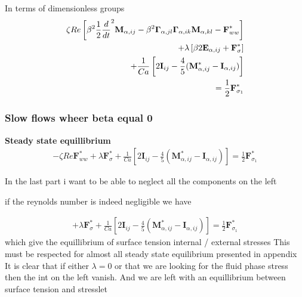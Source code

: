 In terms of dimensionless groups
\begin{align*}
    \zeta Re\left[
        \beta^2 \frac{1}{2}\frac{d}{d t}^2 \textbf{M}_{\alpha,ij}
    -   \beta^2 \bm\Gamma_{\alpha,jl}\bm\Gamma_{\alpha,ik} \textbf{M}_{\alpha,kl}  
    - \textbf{F}_{ww}^*
    \right]\\
    + \lambda  \left[
        \beta 2\textbf{E}_{\alpha,ij}
    +  \textbf{F}_\sigma^*
    \right]\\
    + \frac{1}{Ca} \left[
    2\textbf{I}_{ij} 
    - \frac{4  }{5} (\textbf{M}_{\alpha,ij}^* - \textbf{I}_{\alpha,ij})
    \right]\\
    = 
    \frac{1}{2}
    \textbf{F}_{\sigma_1}^*
\end{align*}


\subsubsection*{Slow flows wheer beta equal 0 }

\textbf{Steady state equillibrium }
\begin{align*}
    - \zeta Re \textbf{F}_{ww}^*
    + \lambda  \textbf{F}_\sigma^*
    + \frac{1}{Ca} \left[
    2\textbf{I}_{ij} 
    - \frac{4  }{5} (\textbf{M}_{\alpha,ij}^* - \textbf{I}_{\alpha,ij})
    \right]
    = 
    \frac{1}{2}
    \textbf{F}_{\sigma_1}^*
\end{align*}

In the last part i want to be able to neglect all the components on the left

if the reynolds number is indeed negligible we have 

\begin{align*}
    + \lambda  \textbf{F}_\sigma^*
    + \frac{1}{Ca} \left[
    2\textbf{I}_{ij} 
    - \frac{4  }{5} (\textbf{M}_{\alpha,ij}^* - \textbf{I}_{\alpha,ij})
    \right]
    = 
    \frac{1}{2}
    \textbf{F}_{\sigma_1}^*
\end{align*}
which give the equillibrium of surface tension internal / external stresses
This must be respected for almost all steady state equilibrium presented in appendix
It is clear that if either $\lambda = 0$ or that we are looking for the fluid phase stress then the int on the left vanish. 
And we are left with an equillibrium between surface tension and stresslet

